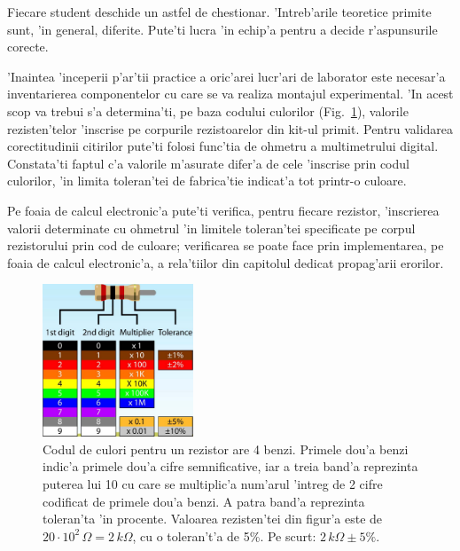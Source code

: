 Fiecare student deschide un astfel de chestionar. 'Intreb'arile teoretice primite sunt, 'in general, diferite. Pute'ti lucra 'in echip'a pentru a decide r'aspunsurile corecte.

%
%
\begin{exercise}
	'Inaintea 'inceperii p'ar'tii practice a oric'arei lucr'ari de laborator este necesar'a inventarierea componentelor cu care se va realiza montajul experimental. 'In acest scop va trebui s'a determina'ti, pe baza codului culorilor (Fig.~\ref{fig:rezistente_cod_culori}), valorile rezisten'telor 'inscrise pe corpurile rezistoarelor din kit-ul primit. Pentru validarea corectitudinii citirilor pute'ti folosi func'tia de ohmetru a multimetrului digital. Constata'ti faptul c'a valorile m'asurate difer'a de cele 'inscrise prin codul culorilor, 'in limita toleran'tei de fabrica'tie  indicat'a tot printr-o culoare.  
\end{exercise}
\begin{observ}
	Pe foaia de calcul electronic'a pute'ti verifica, pentru fiecare rezistor, 'inscrierea valorii determinate cu ohmetrul 'in limitele toleran'tei specificate pe corpul rezistorului prin cod de culoare; verificarea se poate face prin implementarea, pe foaia de calcul electronic'a, a rela'tiilor din capitolul dedicat propag'arii erorilor. 
\end{observ}
%
\begin{figure}
	\centering
		\includegraphics[width=0.4\textwidth]{laborator_01/figuri/rezistente_cod_culori}
	\caption{Codul de culori pentru un rezistor are 4 benzi. Primele dou'a benzi indic'a primele dou'a cifre semnificative, iar a treia band'a reprezinta puterea lui 10 cu care se multiplic'a num'arul 'intreg de 2 cifre codificat de primele dou'a benzi. A patra band'a reprezinta toleran'ta 'in procente. Valoarea rezisten'tei din figur'a este de $20 \cdot 10^2 \, \Omega = 2 \, k\Omega$, cu o toleran't'a de 5\%. Pe scurt: $2 \, k\Omega \pm 5\%$.}
	\label{fig:rezistente_cod_culori}
\end{figure}
